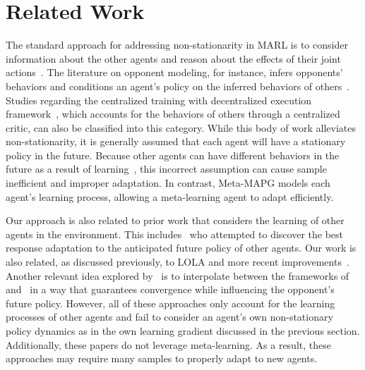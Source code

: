 \section{Related Work}
The standard approach for addressing non-stationarity in MARL is to consider information about the other agents and reason about the effects of their joint actions~\citep{hernandezLealK17survey}.
The literature on opponent modeling, for instance, infers opponents' behaviors and conditions an agent's policy on the inferred behaviors of others~\citep{he16opponent-modeling,raileanu18opponent-modeling,grover18policy-representation}.
Studies regarding the centralized training with decentralized execution framework~\citep{lowe17maddpg,foerster2017counterfactual,yang18mean-field-marl,wen2018probabilistic}, which accounts for the behaviors of others through a centralized critic, can also be classified into this category.
While this body of work alleviates non-stationarity, it is generally assumed that each agent will have a stationary policy in the future.
Because other agents can have different behaviors in the future as a result of learning~\citep{foerster17lola}, this incorrect assumption can cause sample inefficient and improper adaptation.
In contrast, Meta-MAPG models each agent's learning process, allowing a meta-learning agent to adapt efficiently.

Our approach is also related to prior work that considers the learning of other agents in the environment. 
This includes~\citet{zhang10lookahead} who attempted to discover the best response adaptation to the anticipated future policy of other agents. Our work is also related, as discussed previously, to LOLA \citep{foerster17lola} and more recent improvements~\citep{foerster2018dice}.
Another relevant idea explored by~\citet{letcher2018stable} is to interpolate between the frameworks of~\citet{zhang10lookahead} and~\citet{foerster17lola} in a way that guarantees convergence while influencing the opponent's future policy.
However, all of these approaches only account for the learning processes of other agents and fail to consider an agent's own non-stationary policy dynamics as in the own learning gradient discussed in the previous section. 
Additionally, these papers do not leverage meta-learning. As a result, these approaches may require many samples to properly adapt to new agents.

